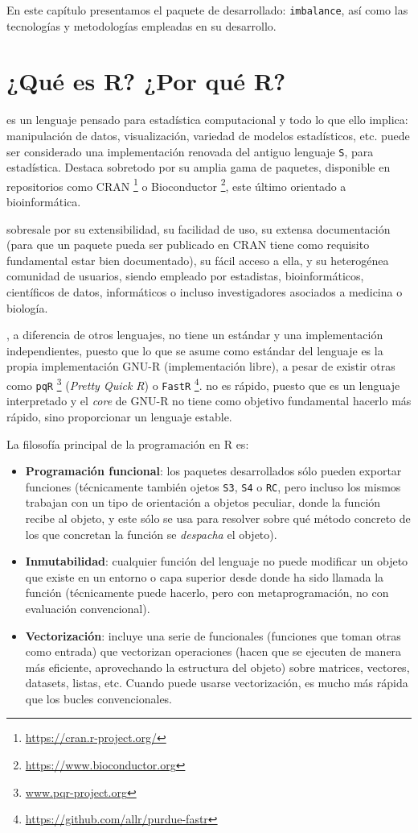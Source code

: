En este capítulo presentamos el paquete de \R desarrollado: \texttt{imbalance}, así como las tecnologías y 
metodologías empleadas en su desarrollo.

\section{¿Qué es R? ¿Por qué R?}
 es un lenguaje pensado para estadística computacional y todo lo que ello implica: 
manipulación de datos, visualización, variedad de modelos estadísticos, etc. \R puede ser considerado una 
implementación renovada del antiguo lenguaje \texttt{S}, para estadística. Destaca sobretodo por su amplia gama de
paquetes, disponible en repositorios como CRAN \footnote{\url{https://cran.r-project.org/}} o 
Bioconductor \footnote{\url{https://www.bioconductor.org}}, este último orientado a bioinformática.

\R sobresale por su extensibilidad, su facilidad de uso, su extensa documentación (para que un paquete pueda ser
publicado en CRAN tiene como requisito fundamental estar bien documentado), su fácil acceso a ella,
y su heterogénea comunidad de usuarios, siendo empleado por estadistas, bioinformáticos, científicos
de datos, informáticos o incluso investigadores asociados a medicina o biología.

\R, a diferencia de otros lenguajes, no tiene un estándar y una implementación independientes, puesto que lo que se
asume como estándar del lenguaje es la propia implementación GNU-R (implementación libre), a pesar de existir otras 
como \texttt{pqR} \footnote{\url{www.pqr-project.org}} (\textit{Pretty Quick R}) o 
\texttt{FastR} \footnote{\url{https://github.com/allr/purdue-fastr}}. \R no es rápido, puesto que es un 
lenguaje interpretado y el \textit{core} de GNU-R no tiene como objetivo fundamental hacerlo más rápido, sino
proporcionar un lenguaje estable. 

La filosofía principal de la programación en R es:

\begin{itemize}
  \item \textbf{Programación funcional}: los paquetes desarrollados sólo pueden exportar funciones (técnicamente
  también ojetos \texttt{S3}, \texttt{S4} o \texttt{RC}, pero incluso los mismos trabajan con un tipo de orientación
  a objetos peculiar, donde la función recibe al objeto, y este sólo se usa para resolver sobre qué método concreto
  de los que concretan la función se \textit{despacha} el objeto).
  \item \textbf{Inmutabilidad}: cualquier función del lenguaje no puede modificar un objeto que existe en
  un entorno o capa superior desde donde ha sido llamada la función (técnicamente puede hacerlo, pero con metaprogramación,
  no con evaluación convencional).
  \item \textbf{Vectorización}: \R incluye una serie de funcionales (funciones que toman otras como entrada) 
  que vectorizan operaciones (hacen que se ejecuten de manera más eficiente, aprovechando la estructura del objeto)
  sobre matrices, vectores, datasets, listas, etc. Cuando puede usarse vectorización, es mucho más
  rápida que los bucles convencionales.
\end{itemize}

